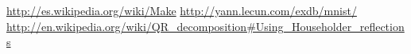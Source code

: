 \urldef\wikiMakefile\url{http://es.wikipedia.org/wiki/Make}
\urldef\mnistURL\url{http://yann.lecun.com/exdb/mnist/}
\urldef\wikiHouseholder\url{http://en.wikipedia.org/wiki/QR_decomposition#Using_Householder_reflections}
